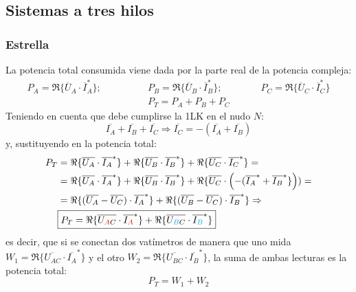 	\subsection{Sistemas a tres hilos}\label{sec.potencia_3H}
	
	\subsubsection{Estrella}
	
	La potencia total consumida viene dada por la parte real de la potencia compleja: 
	\begin{align*}
	    P_A=\Re\{\overline{U}_A \cdot \overline{I}_A^*\};\qquad \qquad
	    &P_B=\Re\{\overline{U}_B \cdot \overline{I}_B^*\};\qquad \qquad
	    P_C=\Re\{\overline{U}_C \cdot \overline{I}_C^*\}\\
	    &P_T=P_A+P_B+P_C
	\end{align*}
	Teniendo en cuenta que debe cumplirse la 1LK en el nudo $N$:
	\begin{equation*}
	    \overline{I_A}+\overline{I_B}+\overline{I_C}\Rightarrow \overline{I_C}=-(\overline{I_A}+\overline{I_B})
	\end{equation*}
	y, sustituyendo en la potencia total: 
	\begin{align}
          P_T &= \Re\{\overline{U_{A}} \cdot \overline{I_A}^*\} + \Re\{\overline{U_{B}} \cdot  \overline{I_B}^*\} + \Re\{\overline{U_{C}} \cdot \overline{I_C}^*\} = \nonumber\\
          &= \Re\{\overline{U_{A}} \cdot  \overline{I_A}^*\} + \Re\{\overline{U_{B}} \cdot  \overline{I_B}^*\} + \Re\{\overline{U_{C}} \cdot \left(-(\overline{I_A}^*+\overline{I_B}^*\}\right))=\nonumber \\
	    & =\Re\{(\overline{U_A}-\overline{U_C}) \cdot  \overline{I_A}^*\} + \Re\{(\overline{U_B}-\overline{U_C}) \cdot  \overline{I_B}^*\} \Rightarrow \nonumber\\  &\boxed{P_T = \Re\{\overline{U_{\textcolor{red}{A}C}} \cdot \overline{I_{\textcolor{red}{A}}}^*\} + \Re\{\overline{U_{\textcolor{cyan}{B}C}} \cdot \overline{I_{\textcolor{cyan}{B}}}^*\}}
	\end{align}
	es decir, que si se conectan dos vatímetros de manera que uno mida $W_1=\Re\{\overline{U_{AC}} \cdot \overline{I_A}^*\}$ y el otro $W_2=\Re\{\overline{U_{BC}} \cdot \overline{I_B}^*\}$, la suma de ambas lecturas es la potencia total: 
	\begin{equation*}
	    P_T=W_1+W_2
	\end{equation*}

